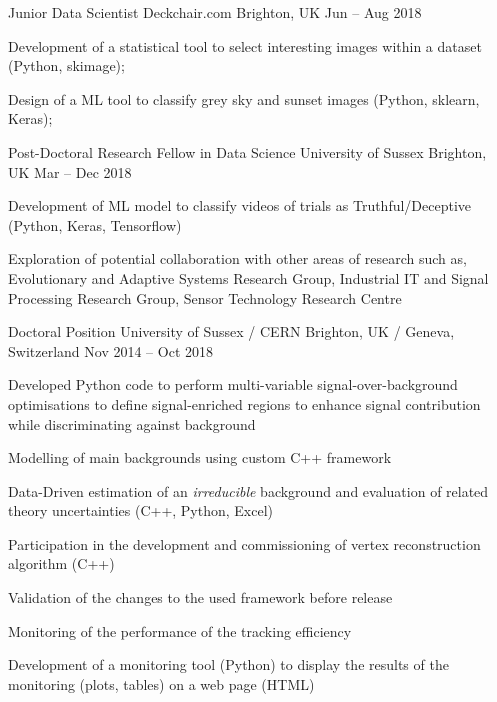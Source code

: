 \begin{cventries}
    \cventry
    {Junior Data Scientist}
    {Deckchair.com}
    {Brighton, UK}
    {Jun -- Aug 2018}
    {
      \begin{cvitems}
        \item Development of a statistical tool to select interesting images within a dataset (Python, skimage);
        \item Design of a ML tool to classify grey sky and sunset images (Python, sklearn, Keras);
      \end{cvitems}
    }
  \end{cventries}


  \begin{cventries}
    \cventry
    {Post-Doctoral Research Fellow in Data Science}
    {University of Sussex}
    {Brighton, UK}
    {Mar -- Dec 2018}
    {
      \begin{cvitems}
        \item Development of ML model to classify videos of trials as Truthful/Deceptive (Python, Keras, Tensorflow)
        \item Exploration of potential collaboration with other areas of research such as, Evolutionary and Adaptive Systems Research Group, Industrial IT and Signal Processing Research Group, Sensor Technology Research Centre
      \end{cvitems}
    }
  \end{cventries}

  \begin{cventries}
    \cventry
    {Doctoral Position}
    {University of Sussex / CERN}
    {Brighton, UK / Geneva, Switzerland}
    {Nov 2014 -- Oct 2018}
    {
    \begin{cvitems}
      \item Developed Python code to perform multi-variable signal-over-background optimisations to define signal-enriched regions to enhance signal contribution while discriminating against background
      \item Modelling of main backgrounds using custom C++ framework
      \item Data-Driven estimation of an \emph{irreducible} background and evaluation of related theory uncertainties (C++, Python, Excel)
      \item Participation in the development and commissioning of vertex reconstruction algorithm (C++)
      \item Validation of the changes to the used framework before release
      \item Monitoring of the performance of the tracking efficiency
      \item Development of a monitoring tool (Python) to display the results of the monitoring (plots, tables) on a web page (HTML)
    \end{cvitems}
    }
  \end{cventries}

